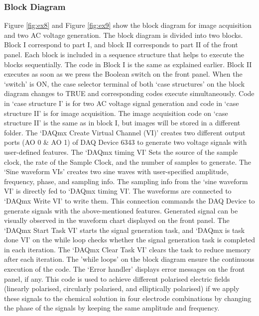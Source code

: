 \documentclass[journal=jacsat,manuscript=article]{achemso}
\begin{document}
\subsubsection{Block Diagram}
Figure \ref{fig:ex8} and Figure \ref{fig:ex9} show the block diagram for image acquisition and two AC voltage generation. The block diagram is divided into two blocks. Block I correspond to part I, and block II corresponds to part II of the front panel. Each block is included in a sequence structure that helps to execute the blocks sequentially. The code in Block I is the same as explained earlier. Block II executes as soon as we press the Boolean switch on the front panel. When the ‘switch’ is ON, the case selector terminal of both ‘case structures’ on the block diagram changes to TRUE and corresponding codes execute simultaneously. Code in ‘case structure I’ is for two AC voltage signal generation and code in ‘case structure II’ is for image acquisition. The image acquisition code on ‘case structure II’ is the same as in block I, but images will be stored in a different folder. The ‘DAQmx Create Virtual Channel (VI)’ creates two different output ports (AO 0 \& AO 1) of DAQ Device 6343 to generate two voltage signals with user-defined features. The ‘DAQmx timing VI’ Sets the source of the sample clock, the rate of the Sample Clock, and the number of samples to generate. The ‘Sine waveform VIs’ creates two sine waves with user-specified amplitude, frequency, phase, and sampling info. The sampling info from the ‘sine waveform VI’ is directly fed to ‘DAQmx timing VI'. The waveforms are connected to ‘DAQmx Write VI’ to write them.  This connection commands the DAQ Device to generate signals with the above-mentioned features. Generated signal can be visually observed in the waveform chart displayed on the front panel. The ‘DAQmx Start Task VI’ starts the signal generation task, and ‘DAQmx is task done VI’ on the while loop checks whether the signal generation task is completed in each iteration. The ‘DAQmx Clear Task VI’ clears the task to reduce memory after each iteration. The 'while loops' on the block diagram ensure the continuous execution of the code. The ‘Error handler’ displays error messages on the front panel, if any. This code is used to achieve different polarised electric fields (linearly polarised, circularly polarised, and elliptically polarised) if we apply these signals to the chemical solution in four electrode combinations by changing the phase of the signals by keeping the same amplitude and frequency. 
\end{document}
